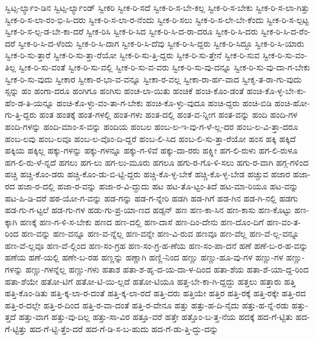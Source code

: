 {ಸ್ವಿಟ್ಸ-ರ್ಲ್ಯಾಂ-ಡಿನ
ಸ್ವಿಟ್ಸ-ರ್ಲ್ಯಾಂಡ್
ಸ್ವೀಕರಿ
ಸ್ವೀಕ-ರಿ-ಸದೆ
ಸ್ವೀಕ-ರಿ-ಸ-ಬೇ-ಕಲ್ಲ
ಸ್ವೀಕ-ರಿ-ಸ-ಬೇಕು
ಸ್ವೀಕ-ರಿ-ಸ-ಲಾ-ಗಿತ್ತು
ಸ್ವೀಕ-ರಿ-ಸ-ಲಾ-ರಂ-ಭಿ-ಸಿ-ದರು
ಸ್ವೀಕ-ರಿ-ಸ-ಲಾ-ರ-ನೆಂದು
ಸ್ವೀಕ-ರಿ-ಸಲು
ಸ್ವೀಕ-ರಿ-ಸ-ಲೇ-ಬೇ-ಕೆಂದು
ಸ್ವೀಕ-ರಿ-ಸ-ಲ್ಪಟ್ಟ
ಸ್ವೀಕ-ರಿ-ಸ-ಲ್ಪ-ಡ-ಬೇ-ಕಾ-ದರೆ
ಸ್ವೀಕ-ರಿಸಿ
ಸ್ವೀಕ-ರಿ-ಸಿದ
ಸ್ವೀಕ-ರಿ-ಸಿ-ದ-ರಾ-ದರೂ
ಸ್ವೀಕ-ರಿ-ಸಿ-ದರು
ಸ್ವೀಕ-ರಿ-ಸಿ-ದ-ರೆಂ-ದರೆ
ಸ್ವೀಕ-ರಿ-ಸಿ-ದ-ಳೆಂದು
ಸ್ವೀಕ-ರಿ-ಸಿ-ದಾಗ
ಸ್ವೀಕ-ರಿ-ಸಿ-ದೆವು
ಸ್ವೀಕ-ರಿ-ಸಿ-ದ್ದರು
ಸ್ವೀಕ-ರಿ-ಸಿದ್ದೂ
ಸ್ವೀಕ-ರಿ-ಸಿ-ಯಾರು
ಸ್ವೀಕ-ರಿ-ಸು-ತ್ತಾರೆ
ಸ್ವೀಕ-ರಿ-ಸು-ತ್ತಾ-ರೆಯೋ
ಸ್ವೀಕ-ರಿ-ಸು-ತ್ತಿ-ದ್ದರು
ಸ್ವೀಕ-ರಿ-ಸು-ತ್ತೇನೆ
ಸ್ವೀಕ-ರಿ-ಸುವ
ಸ್ವೀಕ-ರಿ-ಸು-ವಂ-ತಿಲ್ಲ
ಸ್ವೀಕ-ರಿ-ಸು-ವಂತೆ
ಸ್ವೀಕ-ರಿ-ಸು-ವಲ್ಲಿ
ಸ್ವೀಕ-ರಿ-ಸು-ವ-ವರು
ಸ್ವೀಕ-ರಿ-ಸು-ವು-ದನ್ನೂ
ಸ್ವೀಕ-ರಿ-ಸು-ವು-ದಾ-ಗ-ಬೇಕು
ಸ್ವೀಕ-ರಿ-ಸು-ವುದು
ಸ್ವೀಕಾರ
ಸ್ವೀಕಾ-ರ-ಭಾ-ವ-ವನ್ನೂ
ಸ್ವೀಕಾ-ರ-ವಲ್ಲ
ಸ್ವೀಕಾ-ರಾ-ರ್ಹ-ವಾದ
ಸ್ವೀಕೃ-ತ-ರಾ-ಗು-ವುದು
ಸ್ಸನ್ನು
ಹಂ
ಹಂಗಾ-ದರೂ
ಹಂಗಿಗೂ
ಹಂಗಿಸು
ಹಂಚ-ಲಾ-ಯಿತು
ಹಂಚಿಕೆ
ಹಂಚಿ-ಕೊಂ-ಡಂತೆ
ಹಂಚಿ-ಕೊ-ಳ್ಳ-ಬೇ-ಕು-ಹೆಂ-ಡ-ತಿ-ಯನ್ನೂ
ಹಂಚಿ-ಕೊ-ಳ್ಳು-ವಂ-ತಾ-ಗ-ಬೇಕು
ಹಂಚಿ-ಕೊ-ಳ್ಳು-ವುದೂ
ಹಂಚಿ-ದ್ದರು
ಹಂಚಿ-ಬಿಡಿ
ಹಂಚಿ-ಹೋ-ಗು-ತ್ತಿ-ದ್ದರು
ಹಂತ
ಹಂತಕ್ಕೆ
ಹಂತ-ಗಳಲ್ಲಿ
ಹಂತ-ಗಳು
ಹಂತ-ದಲ್ಲಿ
ಹಂತ-ವ-ನ್ನೀಗ
ಹಂತ-ವನ್ನು
ಹಂದಿ
ಹಂದಿ-ಗಳ
ಹಂದಿ-ಗಳನ್ನು
ಹಂದಿ-ಮಾಂ-ಸ-ವನ್ನು
ಹಂದಿಯ
ಹಂಬಲ
ಹಂಬ-ಲ-ಇ-ವು-ಗ-ಳೆ-ಲ್ಲ-ದರ
ಹಂಬ-ಲ-ವಿ-ತ್ತಾ-ದರೂ
ಹಂಬ-ಲವು
ಹಂಬ-ಲವೂ
ಹಂಬ-ಲ-ವೊಂ-ದಿ-ದ್ದರೆ
ಹಂಬ-ಲಿ-ಸಿದ
ಹಂಬ-ಲಿ-ಸು-ತ್ತಾ-ರೆಯೋ
ಹಂಸ
ಹಕ್ಕಿ
ಹಕ್ಕಿದೆ
ಹಕ್ಕಿಯ
ಹಕ್ಕಿಲ್ಲ
ಹಕ್ಕು-ಗಳನ್ನು
ಹಕ್ಕು-ಗಳನ್ನೂ
ಹಕ್ಕು-ಗ-ಳಿವೆ
ಹಕ್ಕು-ದಾ-ರರು
ಹಕ್ಸ್ಲೀ
ಹಗ-ಲಿ-ರುಳು
ಹಗ-ಲಿ-ರುಳೂ
ಹಗ-ಲಿ-ರು-ಳೆ-ನ್ನದೆ
ಹಗಲು
ಹಗ-ಲು
ಹಗ-ಲು-ಮೂರು
ಹಗಲೂ
ಹಗು-ರ-ಗೊ-ಳಿ-ಸಲು
ಹಗು-ರ-ವಾಗಿ
ಹಗ್ಗ-ಗಳಿಂದ
ಹಚ್ಚಿ
ಹಚ್ಚಿ-ಕೊಂ-ಡರು
ಹಚ್ಚಿ-ಕೊಂ-ಡು-ಬಿ-ಟ್ಟಿ-ದ್ದರು
ಹಚ್ಚಿ-ಕೊ-ಳ್ಳ-ಬೇಕೆ
ಹಚ್ಚಿ-ಕೊ-ಳ್ಳ-ಬೇಡ
ಹಚ್ಚುವ
ಹಜಾರ
ಹಜಾ-ರದ
ಹಜಾ-ರ-ದಲ್ಲಿ
ಹಜಾ-ರ-ವನ್ನು
ಹಜಾ-ರ-ವಿ-ದ್ದುದು
ಹಟ
ಹಟ-ತೊ-ಟ್ಟಂ-ತಿದೆ
ಹಟ-ಮಾ-ರಿಯೂ
ಹಟ-ವನ್ನು
ಹಟ-ಹಿ-ಡಿ-ದರೆ
ಹಠ-ಯೋ-ಗ-ವನ್ನು
ಹಡ-ಗನ್ನು
ಹಡ-ಗ-ನ್ನೇರಿ
ಹಡಗಿ
ಹಡ-ಗಿಗೆ
ಹಡ-ಗಿನ
ಹಡ-ಗಿ-ನಲ್ಲಿ
ಹಡಗು
ಹಡ-ಗು-ಗ-ಟ್ಟಲೆ
ಹಡ-ಗು-ಗಳ
ಹಡು-ಗು-ಪ್ರ-ಯಾ-ಣದ
ಹಡ್ಸನ್
ಹಣ
ಹಣ-ಕಾ-ಸಿನ
ಹಣ-ಕಾಸು
ಹಣ-ಕೊಟ್ಟು
ಹಣ-ಕ್ಕಾಗಿ
ಹಣಕ್ಕೆ
ಹಣ-ಗ-ಳಿ-ಸ-ಬೇಕು
ಹಣದ
ಹಣ-ದಲ್ಲಿ
ಹಣ-ದಾಸೆ
ಹಣ-ದಿಂ-ದೇನು
ಹಣ-ದೊಂ-ದಿಗೆ
ಹಣ-ವಂ-ತ-ರಿಂದ
ಹಣ-ವನ್ನು
ಹಣ-ವನ್ನೂ
ಹಣ-ವ-ನ್ನೆಲ್ಲ
ಹಣ-ವನ್ನೇ
ಹಣ-ವಿ-ರುವ
ಹಣವೂ
ಹಣ-ವೆಲ್ಲ
ಹಣ-ವೆ-ಲ್ಲ-ವನ್ನೂ
ಹಣ-ವೆ-ಲ್ಲವೂ
ಹಣ-ವೆ-ಲ್ಲಿಂದ
ಹಣ-ಸಂ-ಗ್ರಹ
ಹಣ-ಸಂ-ಗ್ರ-ಹ-ಣೆಯ
ಹಣ-ಸಂ-ಪಾ-ದನೆ
ಹಣೆ
ಹಣೆ-ಬ-ರ-ಹ-ವನ್ನು
ಹಣೆಯ
ಹಣೆ-ಯಲ್ಲಿ
ಹಣೇ-ಬ-ರಹ
ಹಣ್ಣನ್ನು
ಹಣ್ಣಾಗಿ
ಹಣ್ಣಿ-ನಿಂದ
ಹಣ್ಣು
ಹಣ್ಣು-ಹೂ-ವು-ಗಳ
ಹಣ್ಣು-ಗಳ
ಹಣ್ಣು-ಗಳನ್ನು
ಹಣ್ಣು-ಗಳನ್ನೆಲ್ಲ
ಹಣ್ಣು-ಗಳು
ಹತಾಶ
ಹತಾ-ಶ-ಹೃ-ದ-ಯ-ದಾ-ಳ-ದಿಂದ
ಹತಾ-ಶೆಯ
ಹತಾ-ಶೆ-ಯಾ-ದ್ದ-ರಿಂದ
ಹತಾ-ಶೆಯೇ
ಹತೋ-ಟಿಗೆ
ಹತೋ-ಟಿ-ಯಿ-ಲ್ಲದೆ
ಹತೋ-ಟಿಯೂ
ಹತ್ತ-ಬೇ-ಕಾ-ಗಿ-ದ್ದದ್ದು
ಹತ್ತಲು
ಹತ್ತಾರು
ಹತ್ತಿ
ಹತ್ತಿ-ಕೊಂ-ಡಿತು
ಹತ್ತಿ-ಕ್ಕ-ಲಾ-ರ-ದಂತೆ
ಹತ್ತಿ-ಕ್ಕ-ಲಾ-ರದೆ
ಹತ್ತಿ-ದರು
ಹತ್ತಿಯೇ
ಹತ್ತಿರ
ಹತ್ತಿ-ರಕ್ಕೆ
ಹತ್ತಿ-ರಕ್ಕೇ
ಹತ್ತಿ-ರದ
ಹತ್ತಿ-ರ-ದಲ್ಲೇ
ಹತ್ತಿ-ರ-ದಿಂದ
ಹತ್ತಿ-ರ-ವಾ-ದಂತೆ
ಹತ್ತಿ-ರ-ವೇನೂ
ಹತ್ತು
ಹತ್ತು-ಹ-ದಿ-ನೈದು
ಹತ್ತು-ಹ-ನ್ನೆ-ರಡು
ಹತ್ತು-ತ್ತದೆ
ಹತ್ತು-ವಾಗ
ಹತ್ತು-ವು-ದಿಲ್ಲ
ಹತ್ತು-ಸಾ-ವಿರ
ಹತ್ತೂ-ವರೆ
ಹತ್ತೇ
ಹತ್ತೊಂ-ಬ-ತ್ತ-ನೆಯ
ಹದಕ್ಕೆ
ಹದ-ಗೆ-ಟ್ಟಿತು
ಹದ-ಗೆ-ಟ್ಟಿತ್ತು
ಹದ-ಗೆ-ಟ್ಟಿ-ತ್ತೆಂ-ದರೆ
ಹದ-ಗೆ-ಡಿ-ಸ-ಬ-ಹುದು
ಹದ-ಗೆ-ಡು-ತ್ತಿ-ದ್ದು-ದನ್ನು
}
